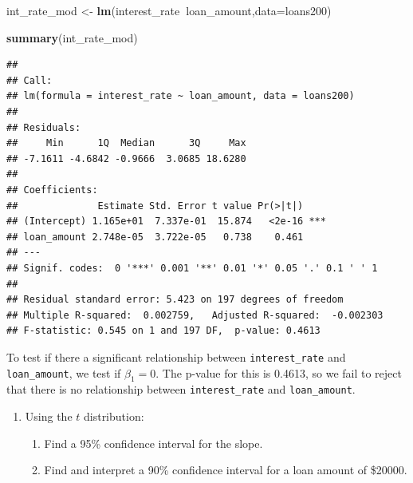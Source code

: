 \documentclass[
]{book}
\newenvironment{Shaded}{\begin{snugshade}}{\end{snugshade}}
\newcommand{\DataTypeTok}[1]{\textcolor[rgb]{0.13,0.29,0.53}{#1}}
\newcommand{\KeywordTok}[1]{\textcolor[rgb]{0.13,0.29,0.53}{\textbf{#1}}}
\newcommand{\NormalTok}[1]{#1}
\newcommand{\OperatorTok}[1]{\textcolor[rgb]{0.81,0.36,0.00}{\textbf{#1}}}
\newcommand{\StringTok}[1]{\textcolor[rgb]{0.31,0.60,0.02}{#1}}
\providecommand{\tightlist}{%
  \setlength{\itemsep}{0pt}\setlength{\parskip}{0pt}}
\begin{document}
\begin{Shaded}
\begin{Highlighting}[]
\NormalTok{int_rate_mod <-}\StringTok{ }\KeywordTok{lm}\NormalTok{(interest_rate}\OperatorTok{~}\NormalTok{loan_amount,}\DataTypeTok{data=}\NormalTok{loans200)}
\end{Highlighting}
\end{Shaded}

\begin{Shaded}
\begin{Highlighting}[]
\KeywordTok{summary}\NormalTok{(int_rate_mod)}
\end{Highlighting}
\end{Shaded}

\begin{verbatim}
## 
## Call:
## lm(formula = interest_rate ~ loan_amount, data = loans200)
## 
## Residuals:
##     Min      1Q  Median      3Q     Max 
## -7.1611 -4.6842 -0.9666  3.0685 18.6280 
## 
## Coefficients:
##              Estimate Std. Error t value Pr(>|t|)    
## (Intercept) 1.165e+01  7.337e-01  15.874   <2e-16 ***
## loan_amount 2.748e-05  3.722e-05   0.738    0.461    
## ---
## Signif. codes:  0 '***' 0.001 '**' 0.01 '*' 0.05 '.' 0.1 ' ' 1
## 
## Residual standard error: 5.423 on 197 degrees of freedom
## Multiple R-squared:  0.002759,   Adjusted R-squared:  -0.002303 
## F-statistic: 0.545 on 1 and 197 DF,  p-value: 0.4613
\end{verbatim}

To test if there a significant relationship between \texttt{interest\_rate} and \texttt{loan\_amount}, we test if \(\beta_1 = 0\). The p-value for this is 0.4613, so we fail to reject that there is no relationship between \texttt{interest\_rate} and \texttt{loan\_amount}.

\begin{enumerate}
\def\labelenumi{\alph{enumi}.}
\setcounter{enumi}{4}
\tightlist
\item
  Using the \(t\) distribution:

  \begin{enumerate}
  \def\labelenumii{\roman{enumii}.}
  \tightlist
  \item
    Find a 95\% confidence interval for the slope.\\
  \item
    Find and interpret a 90\% confidence interval for a loan amount of \$20000.
  \end{enumerate}
\end{enumerate}
\end{document}
